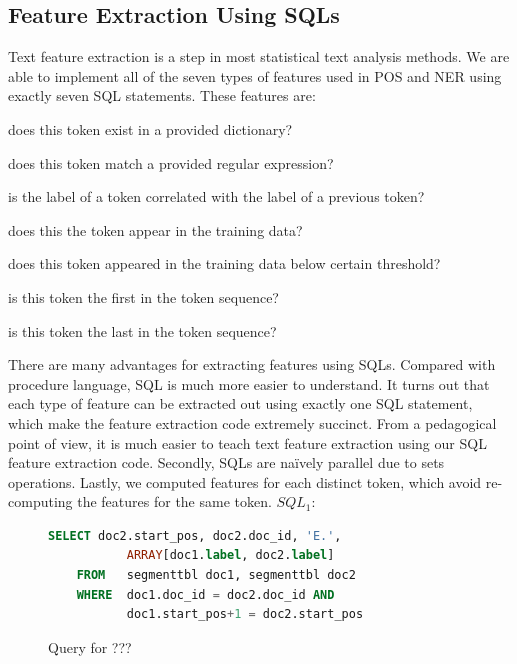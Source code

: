 \documentclass[11pt,letterpaper]{article}
\begin{document}
\subsection{Feature Extraction Using SQLs}
Text feature extraction is a step in most statistical text analysis methods.
We are able to implement all of the seven types of features used in POS and NER using exactly seven 
SQL statements. These features are: 
\begin{description}[noitemsep]
\item[Dictionary features:] does this token exist in a provided dictionary? 
\item[Regex features:] does this token match a provided regular expression? 
\item[Edge features:] is the label of a token correlated with the label of a previous token? 
\item[Word features:] does this the token appear in the training data?
\item[Unknown feature:] does this token appeared in the training data below certain threshold? 
\item[Start feature:] is this token the ﬁrst in the token sequence?
\item[End feature:] is this token the last in the token sequence?
\end{description}

There are many advantages for extracting features using SQLs.  
Compared with procedure language, SQL is much more easier to understand. 
It turns out that each type of feature can be extracted out using exactly one SQL statement, 
which make the feature extraction code extremely succinct.  
From a pedagogical point of view, it is much easier to teach text feature extraction using our SQL feature extraction code.
Secondly, SQLs are naïvely parallel due to sets operations. 
Lastly, we computed features for each distinct token, which avoid re-computing the features for the same token.  
$SQL_1$:\\
\begin{figure}
\centering
\begin{lstlisting}[language=SQL,gobble=4, breaklines=true]
    SELECT doc2.start_pos, doc2.doc_id, 'E.', 
           ARRAY[doc1.label, doc2.label]
    FROM   segmenttbl doc1, segmenttbl doc2
    WHERE  doc1.doc_id = doc2.doc_id AND 
           doc1.start_pos+1 = doc2.start_pos
\end{lstlisting}
\caption{Query for ??? }
\end{figure}
\end{document}
